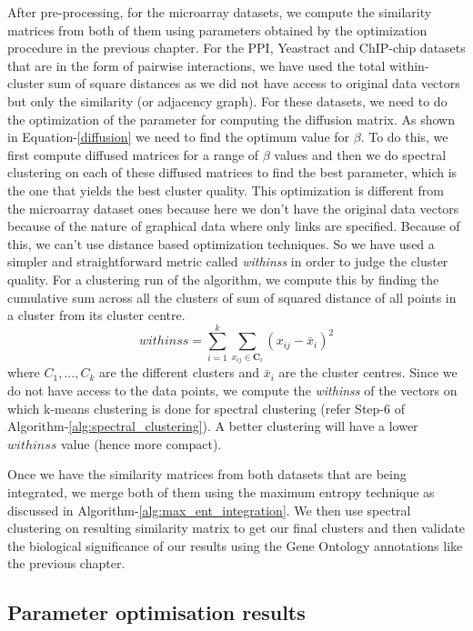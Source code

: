 After pre-processing, for the microarray datasets, we compute the similarity matrices from both of them using parameters obtained by 
the optimization procedure in the previous chapter. For the PPI, Yeastract and ChIP-chip datasets that are in the form 
of pairwise interactions, we have used the total within-cluster sum of square distances as we did not have access to original data vectors but only 
the similarity (or adjacency graph). For these datasets, we need to do the optimization of the parameter for computing the diffusion matrix. 
As shown in Equation-\ref{diffusion} we need to find the optimum value for $\beta$. To do this, we first compute diffused matrices for a range of $\beta$ values 
and then we do spectral clustering on each of these diffused matrices to find the best parameter, which is the one that yields the best cluster quality. This 
optimization is different from the microarray dataset ones because here we don't have the original data vectors because of the nature of graphical data where only 
links are specified. Because of this, we can't use distance based optimization techniques. So we have used a simpler and straightforward metric called \textit{withinss} in order 
to judge the cluster quality. For a clustering run of the algorithm, we compute this by finding the cumulative sum across all the clusters of sum of squared 
distance of all points in a cluster from its cluster centre.
\begin{equation}
    \mathit{withinss}=\sum_{i=1}^{k}\sum_{x_{ij}\in \mathbf{C}_{i}}(x_{ij}-\bar{x}_{i})^2   \label{maxent:eqn:withinss}
\end{equation}
where $C_{1},\dots,C_{k}$ are the different clusters and $\bar{x}_{i}$ are the cluster centres. Since we do not have access to the data points, we compute the \textit{withinss} of the vectors on which k-means clustering is done for spectral clustering (refer Step-6 of Algorithm-\ref{alg:spectral_clustering}). A better clustering will have a lower $withinss$ value (hence more compact). 
 
Once we have the similarity matrices from both datasets that are being integrated, we merge both of them using the maximum entropy technique as 
discussed in Algorithm-\ref{alg:max_ent_integration}. We then use spectral clustering on resulting similarity matrix to get our final clusters and then validate 
the biological significance of our results using the Gene Ontology annotations like the previous chapter.

\subsection{Parameter optimisation results}\label{param_optimisation}

